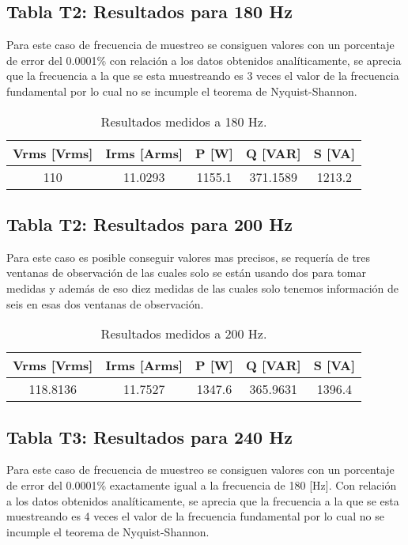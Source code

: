 \subsection*{Tabla T2: Resultados para 180 Hz}
    Para este caso de frecuencia de muestreo se consiguen valores con un porcentaje de error del 0.0001\% con relación a los datos obtenidos analíticamente, se aprecia que la frecuencia a la que se esta muestreando es 3 veces el valor de la frecuencia fundamental por lo cual no se incumple el teorema de Nyquist-Shannon.
    \begin{table}[h!]
        \centering
        \begin{tabular}{@{}ccccc@{}}
            \toprule
            Vrms [Vrms] & Irms [Arms] & P [W] & Q [VAR] & S [VA] \\ \midrule
                110 & 11.0293 & 1155.1 & 371.1589 & 1213.2\\ 
                \bottomrule
        \end{tabular}
        \caption{Resultados medidos a 180 Hz.}
    \end{table}



    \subsection*{Tabla T2: Resultados para 200 Hz}
    Para este caso es posible conseguir valores mas precisos, se requería de tres ventanas de observación de las cuales solo se están usando dos para tomar medidas y además de eso diez medidas de las cuales solo tenemos información de seis en esas dos ventanas de observación.
    \begin{table}[h!]
        \centering
        \begin{tabular}{@{}ccccc@{}}
            \toprule
            Vrms [Vrms] & Irms [Arms] & P [W] & Q [VAR] & S [VA] \\ \midrule
            118.8136 & 11.7527 & 1347.6 & 365.9631 & 1396.4 \\ 
            \bottomrule
        \end{tabular}
        \caption{Resultados medidos a 200 Hz.}
    \end{table}

    \subsection*{Tabla T3: Resultados para 240 Hz}
    Para este caso de frecuencia de muestreo se consiguen valores con un porcentaje de error del 0.0001\% exactamente igual a la frecuencia de 180 [Hz]. Con relación a los datos obtenidos analíticamente, se aprecia que la frecuencia a la que se esta muestreando es 4 veces el valor de la frecuencia fundamental por lo cual no se incumple el teorema de Nyquist-Shannon. 


